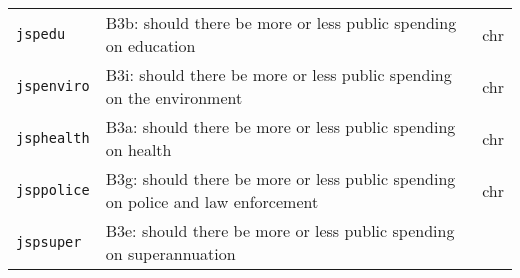 \documentclass[]{article}
\begin{document}
\begin{longtable}[]{@{}lll@{}}
\begin{minipage}[t]{0.14\columnwidth}
\texttt{jspedu}\strut
\end{minipage} & \begin{minipage}[t]{0.70\columnwidth}\raggedright\strut
B3b: should there be more or less public spending on education\strut
\end{minipage} & \begin{minipage}[t]{0.08\columnwidth}\raggedright\strut
chr\strut
\end{minipage}\tabularnewline
\begin{minipage}[t]{0.14\columnwidth}\raggedright\strut
\texttt{jspenviro}\strut
\end{minipage} & \begin{minipage}[t]{0.70\columnwidth}\raggedright\strut
B3i: should there be more or less public spending on the
environment\strut
\end{minipage} & \begin{minipage}[t]{0.08\columnwidth}\raggedright\strut
chr\strut
\end{minipage}\tabularnewline
\begin{minipage}[t]{0.14\columnwidth}\raggedright\strut
\texttt{jsphealth}\strut
\end{minipage} & \begin{minipage}[t]{0.70\columnwidth}\raggedright\strut
B3a: should there be more or less public spending on health\strut
\end{minipage} & \begin{minipage}[t]{0.08\columnwidth}\raggedright\strut
chr\strut
\end{minipage}\tabularnewline
\begin{minipage}[t]{0.14\columnwidth}\raggedright\strut
\texttt{jsppolice}\strut
\end{minipage} & \begin{minipage}[t]{0.70\columnwidth}\raggedright\strut
B3g: should there be more or less public spending on police and law
enforcement\strut
\end{minipage} & \begin{minipage}[t]{0.08\columnwidth}\raggedright\strut
chr\strut
\end{minipage}\tabularnewline
\begin{minipage}[t]{0.14\columnwidth}\raggedright\strut
\texttt{jspsuper}\strut
\end{minipage} & \begin{minipage}[t]{0.70\columnwidth}\raggedright\strut
B3e: should there be more or less public spending on
superannuation\strut
\end{minipage} & \begin{minipage}[t]{0.08\columnwidth}\raggedright\strut

\end{minipage}
\end{longtable}
\end{document}

